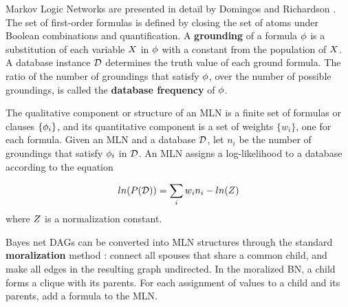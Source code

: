 \documentclass[letterpaper]{article}
\begin{document}
Markov Logic Networks are presented in detail by Domingos and Richardson . The set of first-order formulas is defined by closing the set of atoms under Boolean combinations and quantification. A \textbf{grounding} of a formula $\phi$ is a substitution of each variable $X$ in $\phi$ with a constant from the population of $X$. 
A database instance $\mathcal{D}$ determines the truth value of each ground formula.
The ratio of the number of groundings that satisfy $\phi$, over the number of possible groundings, is called the %
\textbf{database frequency} of $\phi$.



The qualitative component or structure of an MLN is a finite set of formulas or clauses $\{\phi_{i}\}$, and its quantitative component is a set of weights $\{w_{i}\}$, one for each formula. Given an MLN and a database $\mathcal{D}$, let $n_{i}$ be the number of groundings that satisfy $\phi_{i}$ in $\mathcal{D}$. 
An MLN assigns a log-likelihood to a database according to the equation

\begin{equation}\label{eq:log-linear}
ln(P(\mathcal{D})) = \sum_{i} w_{i} n_{i} - ln(Z)
\end{equation}
where $Z$ is a normalization constant. 

Bayes net DAGs can be converted into MLN structures through the standard \textbf{moralization} method \cite[12.5.3]{Domingos2007}: connect all spouses that share a common child, and make all edges in the resulting graph undirected. In the moralized BN, a child forms a clique with its parents. For each assignment of values to a child and its parents, add a formula to the MLN.
\end{document}
